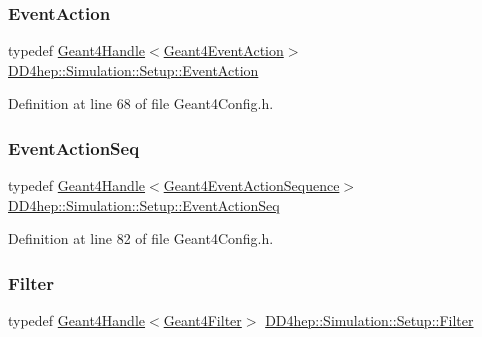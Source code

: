 \subsubsection{\texorpdfstring{Event\+Action}{EventAction}}
{\footnotesize\ttfamily typedef \hyperlink{class_d_d4hep_1_1_simulation_1_1_geant4_handle}{Geant4\+Handle}$<$\hyperlink{class_d_d4hep_1_1_simulation_1_1_geant4_event_action}{Geant4\+Event\+Action}$>$ \hyperlink{namespace_d_d4hep_1_1_simulation_1_1_setup_ad2f4a62fb2f0e3977ad95f8414ed8d26}{D\+D4hep\+::\+Simulation\+::\+Setup\+::\+Event\+Action}}



Definition at line 68 of file Geant4\+Config.\+h.

\hypertarget{namespace_d_d4hep_1_1_simulation_1_1_setup_a4be5336a4ddd9dee751fc71c1f391c38}{}\label{namespace_d_d4hep_1_1_simulation_1_1_setup_a4be5336a4ddd9dee751fc71c1f391c38} 
\subsubsection{\texorpdfstring{Event\+Action\+Seq}{EventActionSeq}}
{\footnotesize\ttfamily typedef \hyperlink{class_d_d4hep_1_1_simulation_1_1_geant4_handle}{Geant4\+Handle}$<$\hyperlink{class_d_d4hep_1_1_simulation_1_1_geant4_event_action_sequence}{Geant4\+Event\+Action\+Sequence}$>$ \hyperlink{namespace_d_d4hep_1_1_simulation_1_1_setup_a4be5336a4ddd9dee751fc71c1f391c38}{D\+D4hep\+::\+Simulation\+::\+Setup\+::\+Event\+Action\+Seq}}



Definition at line 82 of file Geant4\+Config.\+h.

\hypertarget{namespace_d_d4hep_1_1_simulation_1_1_setup_ad8d99728c073de63615427fbb8a1992a}{}\label{namespace_d_d4hep_1_1_simulation_1_1_setup_ad8d99728c073de63615427fbb8a1992a} 
\subsubsection{\texorpdfstring{Filter}{Filter}}
{\footnotesize\ttfamily typedef \hyperlink{class_d_d4hep_1_1_simulation_1_1_geant4_handle}{Geant4\+Handle}$<$\hyperlink{class_d_d4hep_1_1_simulation_1_1_geant4_filter}{Geant4\+Filter}$>$ \hyperlink{namespace_d_d4hep_1_1_simulation_1_1_setup_ad8d99728c073de63615427fbb8a1992a}{D\+D4hep\+::\+Simulation\+::\+Setup\+::\+Filter}}



